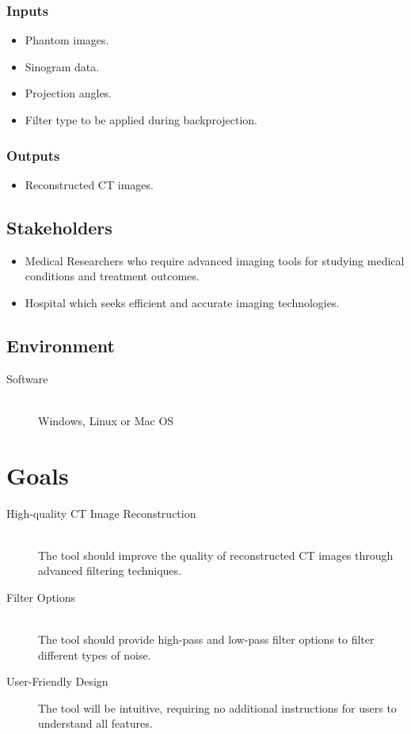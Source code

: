 \documentclass{article}
\begin{document}
\subsubsection{Inputs}
\begin{itemize}
\item Phantom images.
\item Sinogram data.
\item Projection angles.
\item Filter type to be applied during backprojection.
\end{itemize}

\subsubsection{Outputs}
\begin{itemize}
  \item Reconstructed CT images.
\end{itemize}

\subsection{Stakeholders}
\begin{itemize}
\item Medical Researchers who require advanced imaging tools for studying
  medical conditions and treatment outcomes.
\item Hospital which seeks efficient and accurate imaging technologies.
\end{itemize}

\subsection{Environment}
\begin{description}
\item[Software] \hfill \\ Windows, Linux or Mac OS
\end{description}

\section{Goals}
\begin{description}
\item[High-quality CT Image Reconstruction] \hfill \\ The tool should improve
  the quality of reconstructed CT images through advanced filtering techniques.
\item[Filter Options] \hfill \\ The tool should provide high-pass and
  low-pass filter options to filter different types of noise.
\item[User-Friendly Design] \hfill \newline The tool will be intuitive, requiring
  no additional instructions for users to understand all features.
\end{description}
\end{document}
